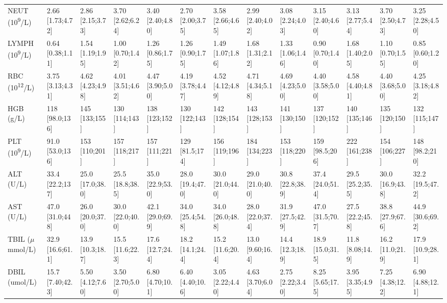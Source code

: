 \documentclass{article}
\begin{document}
\begin{landscape}
\begin{tiny}
\begin{tabularx}{\linewidth}{p{4.5cm}|X|X|X|X|X|X|X|X|X|X|X|X}
\rowcolor{gray!10}
NEUT (10\textsuperscript{9}/L) & 2.66 [1.73;4.72] & 2.86 [2.15;3.73] & 3.70 [2.62;6.24] & 3.40 [2.40;4.80] & 2.70 [2.00;3.75] & 3.58 [2.66;4.65] & 2.99 [2.40;4.02] & 3.08 [2.24;4.03] & 3.15 [2.40;4.60] & 3.13 [2.77;5.44] & 3.70 [2.50;4.73] & 3.25 [2.28;4.50] \\
\rowcolor{gray!10}
LYMPH (10\textsuperscript{9}/L) & 0.64 [0.38;1.11] & 1.54 [1.19;1.95] & 1.00 [0.70;1.42] & 1.26 [0.86;1.75] & 1.26 [0.90;1.75] & 1.49 [1.07;1.86] & 1.68 [1.31;2.12] & 1.33 [1.06;1.46] & 0.90 [0.70;1.40] & 1.68 [1.40;2.05] & 1.10 [0.70;1.55] & 0.85 [0.60;1.20] \\
\rowcolor{gray!10}
RBC (10\textsuperscript{12}/L) & 3.75 [3.13;4.31] & 4.62 [4.23;4.98] & 4.01 [3.51;4.62] & 4.47 [3.90;5.00] & 4.19 [3.78;4.47] & 4.52 [4.12;4.89] & 4.71 [4.34;5.18] & 4.69 [4.23;5.00] & 4.40 [3.58;5.00] & 4.58 [4.40;4.81] & 4.40 [3.68;5.00] & 4.25 [3.18;4.82] \\
\rowcolor{gray!10}
HGB (g/L) &  118 [98.0;136]  &  145 [133;155]   &  130 [114;143]   &  138 [123;152]   &  130 [122;143]   &  142 [128;154]   &  143 [128;153]   &  141 [130;150]   &  137 [120;152]   &  140 [135;146]   &  135 [120;150]   &  132 [115;147]   \\
\rowcolor{gray!10}
PLT (10\textsuperscript{9}/L) & 91.0 [53.0;136]  &  153 [110;201]   &  157 [118;217]   &  157 [111;221]   &  129 [81.5;174]  &  156 [119;196]   &  184 [134;223]   &  153 [118;220]   &  159 [98.5;206]  &  222 [161;238]   &  154 [106;227]   &  148 [98.2;210]  \\
\rowcolor{gray!10}
ALT (U/L) & 33.4 [22.2;137]  & 25.0 [17.0;38.0] & 25.5 [18.8;38.5] & 35.0 [22.9;53.0] & 28.0 [19.4;47.0] & 30.0 [21.0;44.0] & 29.0 [21.0;40.0] & 30.8 [22.8;38.9] & 37.4 [24.0;51.4] & 29.5 [25.2;35.5] & 30.0 [16.9;43.8] & 32.2 [19.5;47.2] \\
\rowcolor{gray!10}
AST (U/L) & 47.0 [31.0;448]  & 26.0 [20.0;37.0] & 30.0 [22.0;40.0] & 42.1 [29.0;69.9] & 34.0 [25.4;54.8] & 34.0 [26.0;48.8] & 28.0 [22.0;37.4] & 31.9 [27.5;42.9] & 47.0 [31.5;70.7] & 27.5 [22.2;45.8] & 38.8 [27.9;67.6] & 44.9 [30.6;69.2] \\
\rowcolor{gray!10}
TBIL ($\mu$mmol/L) & 32.9 [16.6;61.1] & 13.9 [10.3;18.7] & 15.5 [11.6;22.3] & 17.6 [12.7;24.4] & 18.2 [14.1;24.4] & 15.2 [11.6;20.4] & 13.0 [9.60;16.4] & 14.4 [12.3;18.9] & 18.9 [15.0;31.5] & 11.8 [8.08;14.9] & 16.2 [11.0;21.9] & 17.9 [10.9;28.1] \\
\rowcolor{gray!10}
DBIL (umol/L) & 15.7 [7.40;42.3] & 5.50 [4.12;7.60] & 3.50 [2.70;5.00] & 6.80 [4.70;10.1] & 6.40 [4.40;10.6] & 3.05 [2.22;4.40] & 4.63 [3.70;6.04] & 2.75 [2.22;3.40] & 8.25 [5.65;17.5] & 3.95 [3.35;4.95] & 7.25 [4.38;12.2] & 6.90 [4.88;12.1] \\

\end{tabularx}
\end{tiny}
\end{landscape}
\end{document}
